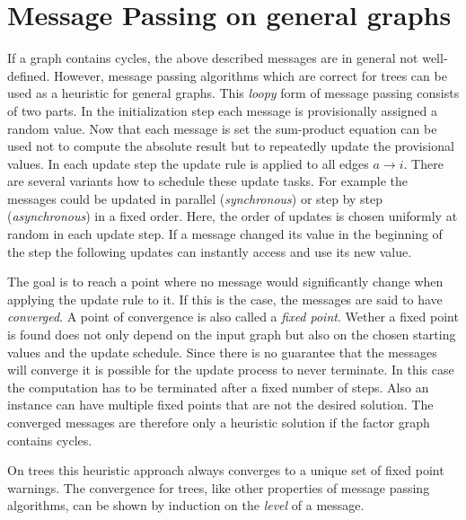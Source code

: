 \section{Message Passing on general graphs}
If a graph contains cycles, the above described messages are in general not well-defined. However, message passing algorithms which are correct for trees can be used as a heuristic for general graphs. \newline
This \emph{loopy} form of message passing consists of two parts. In the initialization  step each message is provisionally assigned a random value. Now that each message is set the sum-product equation can be used not to compute the absolute result but to repeatedly update the provisional values. In each update step the update rule is applied to all edges $a \rightarrow i$. There are several variants how to schedule these update tasks. For example the messages could be updated in parallel (\emph{synchronous}) or step by step (\emph{asynchronous}) in a fixed order. Here, the order of updates is chosen uniformly at random in each update step. If a message changed its value in the beginning of the step the following updates can instantly access and use its new value. 

The goal is to reach a point where no message would significantly change when applying the update rule to it. If this is the case, the messages are said to have \emph{converged}. A point of convergence is also called a \emph{fixed point}. Wether a fixed point is found  does not only depend on the input graph but also on the chosen starting values and the update schedule. Since there is no guarantee that the messages will converge it is possible for the update process to never terminate. In this case the computation has to be terminated after a fixed number of steps. Also an instance can have multiple fixed points that are not the desired solution. The converged messages are therefore only a heuristic solution if the factor graph contains cycles.


On trees this heuristic approach always converges to a unique set of fixed point warnings. The convergence for trees, like other properties of message passing algorithms, can be shown by induction on the \textit{level} of a message.

